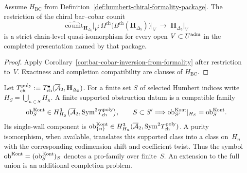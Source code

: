 \begin{lemma}
\label{lem:uadm-is-koszul-locus-bar-cobar}
\ClaimStatusConditional
{}%
Assume $H_{\mathrm{BC}}$ from
Definition~\ref{def:humbert-chiral-formality-package}.  The restriction
of the chiral bar--cobar counit
\[
\widehat{\mathrm{counit}}_{\mathbf H_{\Delta_5}}\big|_{V}\colon
\Omega^{\mathrm{ch}}\bigl(B^{\mathrm{ch}}(\mathbf H_{\Delta_5})\bigr)
\big|_V
\;\longrightarrow\;
\mathbf H_{\Delta_5}\big|_V
\]
is a strict chain-level quasi-isomorphism for every open
$V\subset U^{\mathrm{adm}}$ in the completed presentation named by that package.
\end{lemma}

\begin{proof}
Apply Corollary~\ref{cor:bar-cobar-inversion-from-formality} after
restriction to~$V$.  Exactness and completion compatibility are clauses
of $H_{\mathrm{BC}}$.
\end{proof}

\begin{definition}
\label{def:global-kontsevich-obstruction-sheaf}
%
%
Let $T^{\mathrm{poly}}_{\mathrm{ch}}:=T^\bullet_{\mathrm{ch}}(\overline{\mathcal A}_2,
\mathbf H_{\Delta_5})$.  For a finite set $S$ of selected Humbert
indices write $H_S=\bigcup_{n\in S}H_n$.  A finite supported
obstruction datum is a compatible family
\[
 \mathrm{ob}^{\mathrm{Kont}}_S\in
 H^3_{H_S}\bigl(\overline{\mathcal A}_2,
                 \mathrm{Sym}^2T^{\mathrm{poly}}_{\mathrm{ch}}\bigr),
 \qquad S\subset S'\Longrightarrow
 \mathrm{ob}^{\mathrm{Kont}}_{S'}|_{H_S}=\mathrm{ob}^{\mathrm{Kont}}_S.
\]
Its single-wall component is
$\mathrm{ob}^{\mathrm{Kont}}_{\{n\}}\in H^3_{H_n}(\overline{\mathcal A}_2,
\mathrm{Sym}^2T^{\mathrm{poly}}_{\mathrm{ch}})$.  A purity isomorphism, when available,
translates this supported class into a class on~$H_n$ with the
corresponding codimension shift and coefficient twist.  Thus the symbol
$\mathrm{ob}^{\mathrm{Kont}}=(\mathrm{ob}^{\mathrm{Kont}}_S)_S$ denotes a pro-family over finite~$S$.  An
extension to the full union is an additional completion problem.
\end{definition}

